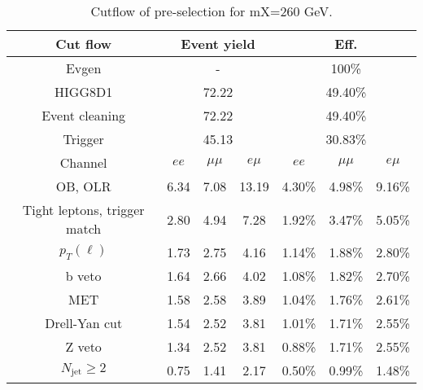 \begin{table}
\centering\small
\begin{tabular}{c|ccc|ccc}
\hline
\hline
Cut flow &\multicolumn{3}{c|}{Event yield}&\multicolumn{3}{c}{Eff.}      \\
\hline
Evgen&\multicolumn{3}{c|}{-}&\multicolumn{3}{c}{100\%}\\
HIGG8D1&\multicolumn{3}{c|}{72.22}&\multicolumn{3}{c}{49.40\%}\\
Event cleaning&\multicolumn{3}{c|}{72.22}&\multicolumn{3}{c}{49.40\%}\\
Trigger&\multicolumn{3}{c|}{45.13    }&\multicolumn{3}{c}{30.83\%}\\
Channel&$ee$&$\mu\mu$&$e\mu$&$ee$&$\mu\mu$&$e\mu$\\
\hline
OB, OLR    &6.34    &7.08    &13.19& 4.30\%    &4.98\%    &9.16\%\\
Tight leptons, trigger match    &2.80    &4.94    &7.28    &1.92\%    &3.47\%    &5.05\%\\
$p_T(\ell)$    &1.73    &2.75    &4.16    &1.14\%    &1.88\%    &2.80\%\\
b veto    &1.64    &2.66    &4.02    &1.08\%    &1.82\%    &2.70\%\\
MET    &1.58    &2.58    &3.89    &1.04\%    &1.76\%    &2.61\%\\
Drell-Yan cut    &1.54    &2.52    &3.81    &1.01\%    &1.71\%    &2.55\%\\
Z veto    &1.34    &2.52    &3.81    &0.88\%    &1.71\%    &2.55\%\\
$N_{\text{jet}}\geq2$    &0.75    &1.41    &2.17    &0.50\%    &0.99\%    &1.48\%\\
\hline
\hline
\end{tabular}
\caption{Cutflow of pre-selection for mX=260 GeV.}
\label{tab:cut_flow_preselection_mX260}
\end{table}
